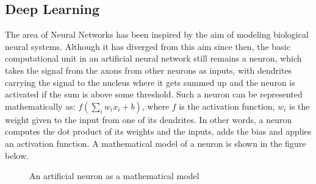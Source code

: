 \subsection{Deep Learning}
\label{section:dl-background}
The area of Neural Networks has been inspired by the aim of modeling biological 
neural systems. Although it has diverged from this aim since then, the basic 
computational unit in an artificial neural network still remains a neuron, 
which takes the signal from the axons from other neurons as inputs, 
with dendrites carrying the signal to the nucleus where it gets summed up and 
the neuron is activated if the sum is above some threshold. Such a neuron can 
be represented mathematically as: $f(\sum_i w_ix_i + b)$, where $f$ is the 
activation function, $w_i$ is the weight given to the input from one of its 
dendrites. In other words, a neuron computes the dot product of its weights and 
the inputs, adds the bias and applies an activation function. A mathematical 
model of a neuron is shown in the figure below.
\begin{figure}[H]
\caption{An artificial neuron as a mathematical model}
\end{figure}

